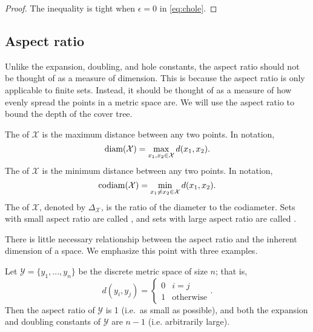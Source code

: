 \documentclass[thesis.tex]{subfiles}
\newcommand{\set}[1]{\mathcal {#1}}
\newcommand{\dist}[2]{\distf({#1},{#2})}
\newcommand{\distf}{d}
\newcommand{\diam}[1]{\textnormal{diam}({#1})}
\newcommand{\codiam}[1]{\textnormal{codiam}({#1})}
\newcommand{\aspect}[1]{\Delta_{#1}}
\begin{document}
\begin{proof}
    The inequality is tight when $\epsilon=0$ in \eqref{eq:chole}.
\end{proof}



\subsection{Aspect ratio}

Unlike the expansion, doubling, and hole constants,
the aspect ratio should not be thought of as a measure of dimension.
This is because the aspect ratio is only applicable to finite sets.
Instead, it should be thought of as a measure of how evenly spread the points in a metric space are.
We will use the aspect ratio to bound the depth of the cover tree.

The  of $\set X$ is the maximum distance between any two points.
In notation,
\begin{equation}
    \diam {\set X} = \max_{x_1,x_2\in\set X} \dist{x_1}{x_2}
    .
\end{equation}
The  of $\set X$ is the minimum distance between any two points.
In notation,
\begin{equation}
    \codiam {\set X} = \min_{x_1 \ne x_2\in\set X} \dist{x_1}{x_2}
    .
\end{equation}
The  of $\set X$, denoted by $\aspect{\set X}$, 
is the ratio of the diameter to the codiameter.
Sets with small aspect ratio are called ,
and sets with large aspect ratio are called .

There is little necessary relationship between the aspect ratio and the inherent dimension of a space.
We emphasize this point with three examples.

\begin{example}
    Let $\set Y=\{y_1,...,y_n\}$ be the discrete metric space of size $n$;
    that is,
    \begin{equation}
        \dist{y_i}{y_j}=
        \begin{cases}
            0 & i = j \\
            1 & \text{otherwise}
        \end{cases}
        .
    \end{equation}
    Then the aspect ratio of $\set Y$ is 1 (i.e.\ as small as possible),
    and both the expansion and doubling constants of $\set Y$ are $n-1$ (i.e. arbitrarily large).
\end{example}
\end{document}
